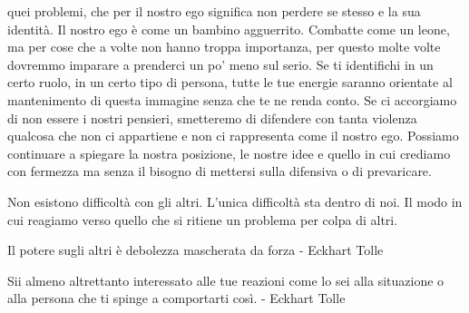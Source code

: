 \documentclass[12pt]{book} %
\begin{document}
quei problemi, che per il nostro ego significa non perdere se stesso e la sua identità. Il nostro ego è come un bambino
agguerrito. Combatte come un leone, ma per cose che a volte non hanno troppa importanza, per questo molte volte
dovremmo imparare a prenderci un po' meno sul serio. Se ti identifichi in un certo ruolo, in un
certo tipo di persona, tutte le tue energie saranno orientate al mantenimento di questa immagine senza che te ne renda
conto. Se ci accorgiamo di non essere i nostri pensieri, smetteremo di difendere con tanta violenza qualcosa che non ci
appartiene e non ci rappresenta come il nostro ego. Possiamo continuare a spiegare la nostra posizione, le nostre idee
e quello in cui crediamo con fermezza ma senza il bisogno di mettersi sulla difensiva o di prevaricare.

Non esistono difficoltà con gli altri. L'unica difficoltà sta dentro di noi. Il modo in cui reagiamo verso quello che si
ritiene un problema per colpa di altri. 

Il potere sugli altri è debolezza mascherata da forza - Eckhart Tolle

Sii almeno altrettanto interessato alle tue reazioni come lo sei alla situazione o alla persona che ti spinge a
comportarti così. - Eckhart Tolle
\end{document}
